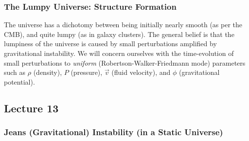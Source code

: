 \documentclass{article}
\begin{document}
\subsubsection*{ The Lumpy Universe: Structure Formation}

The universe has a dichotomy between being initially nearly smooth 
(as per the CMB), and quite lumpy (as in galaxy clusters).  The general
belief is that the lumpiness of the universe is caused by small perturbations
amplified by gravitational instability.  We will concern ourselves with the
time-evolution of
small perturbations to {\it uniform} (Robertson-Walker-Friedmann mode)
parameters such as $\rho$ (density), $P$ (pressure), $\vec v$ (fluid velocity),
and $\phi$ (gravitational potential).


\subsection{Lecture 13}

\subsubsection*{ Jeans (Gravitational) Instability (in a Static Universe)}
\end{document}
